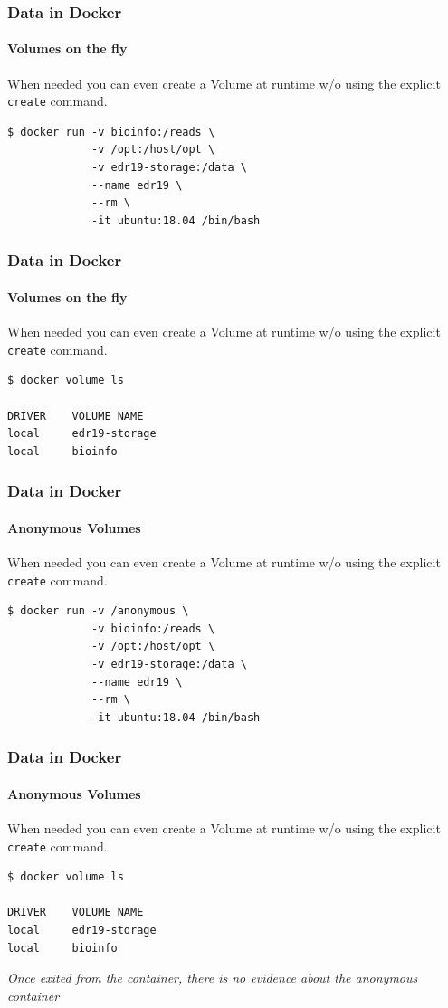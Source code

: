\begin{frame}[fragile]
\frametitle{Data in Docker}
\framesubtitle{Volumes on the fly}

When needed you can even create a Volume at runtime w/o using the explicit \lstinline{create} command. 

\begin{lstlisting}
$ docker run -v bioinfo:/reads \
             -v /opt:/host/opt \
             -v edr19-storage:/data \
             --name edr19 \
             --rm \
             -it ubuntu:18.04 /bin/bash
\end{lstlisting}
\end{frame}

\begin{frame}[fragile]
\frametitle{Data in Docker}
\framesubtitle{Volumes on the fly}

When needed you can even create a Volume at runtime w/o using the explicit \lstinline{create} command. 

\begin{lstlisting}
$ docker volume ls

DRIVER    VOLUME NAME
local     edr19-storage
local     bioinfo
\end{lstlisting}
\end{frame}

\begin{frame}[fragile]
\frametitle{Data in Docker}
\framesubtitle{Anonymous Volumes} 

When needed you can even create a Volume at runtime w/o using the explicit \lstinline{create} command. 

\begin{lstlisting}
$ docker run -v /anonymous \
             -v bioinfo:/reads \
             -v /opt:/host/opt \
             -v edr19-storage:/data \
             --name edr19 \
             --rm \
             -it ubuntu:18.04 /bin/bash
\end{lstlisting}
\end{frame}

\begin{frame}[fragile]
\frametitle{Data in Docker}
\framesubtitle{Anonymous Volumes}

When needed you can even create a Volume at runtime w/o using the explicit \lstinline{create} command. 

\begin{lstlisting}
$ docker volume ls

DRIVER    VOLUME NAME
local     edr19-storage
local     bioinfo
\end{lstlisting}

\it{Once exited from the container, there is no evidence about the anonymous container}
\end{frame}

